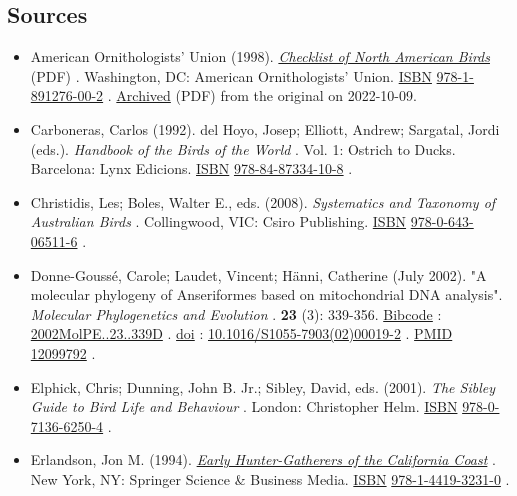 \documentclass[11pt,a4paper]{article}
\begin{document}
\subsection{Sources}

\begin{itemize}
\item American Ornithologists' Union (1998). \href{https://americanornithology.org/wp-content/uploads/2019/07/AOSChecklistTin-Falcon.pdf}{\textit{Checklist of North American Birds}} (PDF) . Washington, DC: American Ornithologists' Union. \href{/wiki/ISBN\_\%28identifier\%29}{ISBN} \href{/wiki/Special:BookSources/978-1-891276-00-2}{978-1-891276-00-2} . \href{https://ghostarchive.org/archive/20221009/https://americanornithology.org/wp-content/uploads/2019/07/AOSChecklistTin-Falcon.pdf}{Archived} (PDF) from the original on 2022-10-09.
\item Carboneras, Carlos (1992). del Hoyo, Josep; Elliott, Andrew; Sargatal, Jordi (eds.). \textit{Handbook of the Birds of the World} . Vol. 1: Ostrich to Ducks. Barcelona: Lynx Edicions. \href{/wiki/ISBN\_\%28identifier\%29}{ISBN} \href{/wiki/Special:BookSources/978-84-87334-10-8}{978-84-87334-10-8} .
\item Christidis, Les; Boles, Walter E., eds. (2008). \textit{Systematics and Taxonomy of Australian Birds} . Collingwood, VIC: Csiro Publishing. \href{/wiki/ISBN\_\%28identifier\%29}{ISBN} \href{/wiki/Special:BookSources/978-0-643-06511-6}{978-0-643-06511-6} .
\item Donne-Goussé, Carole; Laudet, Vincent; Hänni, Catherine (July 2002). "A molecular phylogeny of Anseriformes based on mitochondrial DNA analysis". \textit{Molecular Phylogenetics and Evolution} . \textbf{23} (3): 339-356. \href{/wiki/Bibcode\_\%28identifier\%29}{Bibcode} : \href{https://ui.adsabs.harvard.edu/abs/2002MolPE..23..339D}{2002MolPE..23..339D} . \href{/wiki/Doi\_\%28identifier\%29}{doi} : \href{https://doi.org/10.1016\%2FS1055-7903\%2802\%2900019-2}{10.1016/S1055-7903(02)00019-2} . \href{/wiki/PMID\_\%28identifier\%29}{PMID} \href{https://pubmed.ncbi.nlm.nih.gov/12099792}{12099792} .
\item Elphick, Chris; Dunning, John B. Jr.; Sibley, David, eds. (2001). \textit{The Sibley Guide to Bird Life and Behaviour} . London: Christopher Helm. \href{/wiki/ISBN\_\%28identifier\%29}{ISBN} \href{/wiki/Special:BookSources/978-0-7136-6250-4}{978-0-7136-6250-4} .
\item Erlandson, Jon M. (1994). \href{https://books.google.com/books?id=nGTaBwAAQBAJ\&pg=171}{\textit{Early Hunter-Gatherers of the California Coast}} . New York, NY: Springer Science \& Business Media. \href{/wiki/ISBN\_\%28identifier\%29}{ISBN} \href{/wiki/Special:BookSources/978-1-4419-3231-0}{978-1-4419-3231-0} .

\end{itemize}
\end{document}
